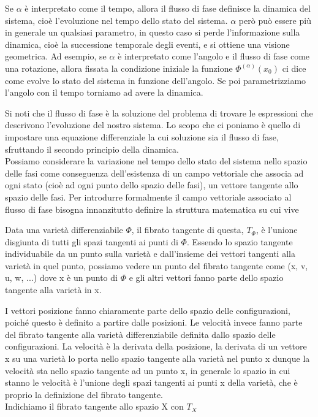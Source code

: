 \documentclass[
10pt, %
a4paper, %
oneside, %
headinclude,footinclude, %
BCOR5mm, %
]{scrartcl}
\begin{document}
\begin{osservazione}
Se $\alpha$ è interpretato come il tempo, allora il flusso di fase definisce la dinamica del sistema, cioè l'evoluzione nel tempo dello stato del sistema. $\alpha$ però può essere più in generale un qualsiasi parametro, in questo caso si perde l'informazione sulla dinamica, cioè la successione temporale degli eventi, e si ottiene una visione geometrica. Ad esempio, se $\alpha$ è interpretato come l'angolo e il flusso di fase come una rotazione, allora fissata la condizione iniziale la funzione \(\Phi^{(\alpha)}(x_0)\) ci dice come evolve lo stato del sistema in funzione dell'angolo. Se poi parametrizziamo l'angolo con il tempo torniamo ad avere la dinamica.
\end{osservazione}
Si noti che il flusso di fase è la soluzione del problema di trovare le espressioni che descrivono l'evoluzione del nostro sistema. Lo scopo che ci poniamo è quello di impostare una equazione differenziale la cui soluzione sia il flusso di fase, sfruttando il secondo principio della dinamica.\\
Possiamo considerare la variazione nel tempo dello stato del sistema nello spazio delle fasi come conseguenza dell'esistenza di un campo vettoriale che associa ad ogni stato (cioè ad ogni punto dello spazio delle fasi), un vettore tangente allo spazio delle fasi. Per introdurre formalmente il campo vettoriale associato al flusso di fase bisogna innanzitutto definire la struttura matematica su cui vive
\begin{definizione}
	Data una varietà differenziabile $\Phi$, il fibrato tangente di questa, \(T_{\Phi}\), è l'unione disgiunta di tutti gli spazi tangenti ai punti di $\Phi$. Essendo lo spazio tangente individuabile da un punto sulla varietà e dall'insieme dei vettori tangenti alla varietà in quel punto, possiamo vedere un punto del fibrato tangente come (x, v, u, w, ...) dove x è un punto di $\Phi$ e gli altri vettori fanno parte dello spazio tangente alla varietà in x. 
\end{definizione}
\begin{osservazione}
	I vettori posizione fanno chiaramente parte dello spazio delle configurazioni, poiché questo è definito a partire dalle posizioni. Le velocità invece fanno parte del fibrato tangente alla varietà differenziabile definita dallo spazio delle configurazioni. La velocità è la derivata della posizione, la derivata di un vettore x su una varietà lo porta nello spazio tangente alla varietà nel punto x dunque la velocità sta nello spazio tangente ad un punto x, in generale lo spazio in cui stanno le velocità è l'unione degli spazi tangenti ai punti x della varietà, che è proprio la definizione del fibrato tangente.\\
	Indichiamo il fibrato tangente allo spazio X con \(T_X\)
\end{osservazione}
\end{document}
